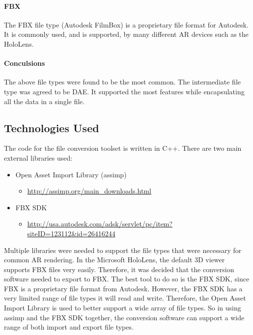     \paragraph{FBX}
    The FBX file type (Autodesk FilmBox) is a proprietary file format for Autodesk.  It is commonly used, and is supported, by many different AR devices such as the HoloLens.

    \paragraph{Conculsions}
    The above file types were found to be the most common.  The intermediate file type was agreed to be DAE.  It supported the most features while encapsulating all the data in a single file.

    \subsection{Technologies Used}
    
    The code for the file conversion toolset is written in C++.  There are two main external libraries used:
    \begin{itemize}
        \item Open Asset Import Library (assimp)
        \begin{itemize}
            \item \url{http://assimp.org/main_downloads.html}
        \end{itemize}

        \item FBX SDK
        \begin{itemize}
            \item \url{http://usa.autodesk.com/adsk/servlet/pc/item?siteID=123112&id=26416244}
        \end{itemize}
    \end{itemize}

    Multiple libraries were needed to support the file types that were necessary for common AR rendering.  In the Microsoft HoloLens, the default
    3D viewer supports FBX files very easily.  Therefore, it was decided that the conversion software needed to export to FBX.  The best tool to do 
    so is the FBX SDK, since FBX is a proprietary file format from Autodesk.  However, the FBX SDK has a very limited range of file types it will read and write.
    Therefore, the Open Asset Import Library is used to better support a wide array of file types.  So in using assimp and the FBX SDK together,
    the conversion software can support a wide range of both import and export file types.


